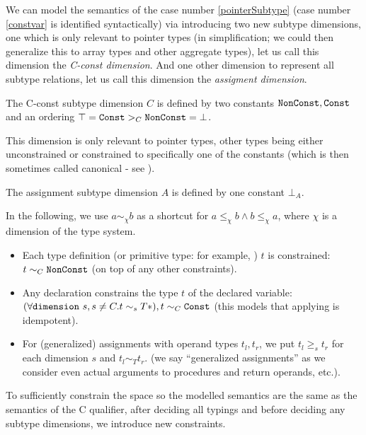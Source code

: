 We can model the semantics of the case number \ref{pointerSubtype} (case number \ref{constvar} is identified syntactically) via introducing two new subtype dimensions, one which is only relevant to pointer types (in simplification; we could then generalize this to array types and other aggregate types), let us call this dimension the \emph{C-const dimension}. And one other dimension to represent all subtype relations, let us call this dimension the \emph{assigment dimension}.

\begin{defn}
    The C-const subtype dimension $C$ is defined by two constants $\mathtt{NonConst}, \mathtt{Const}$ and an ordering $\top = \mathtt{Const} >_C \mathtt{NonConst} = \bot$.

    This dimension is only relevant to pointer types, other types being either unconstrained or constrained to specifically one of the constants (which is then sometimes called canonical - see \cite{tiuryn1999subtyping}).
\end{defn}

\begin{defn}
    The assignment subtype dimension $A$ is defined by one constant $\bot_A$.
\end{defn}

In the following, we use $a \sim_\chi b$ as a shortcut for $a \leq_\chi b \land b \leq_\chi a$, where $\chi$ is a dimension of the type system.

\begin{itemize}
    \item Each type definition (or primitive type: for example, ) $t$ is constrained: $t \sim_C \mathtt{NonConst}$ (on top of any other constraints).

    \item Any declaration  constrains the type $t$ of the declared variable: $(\forall \mathtt{dimension}\ s, s \neq C. t \sim_s T\ast), t \sim_C \mathtt{Const}$ (this models that applying  is idempotent).

    \item For (generalized) assignments with operand types $t_l, t_r$, we put $t_l \geq_s t_r$ for each dimension $s$ and $t_l \sim_T t_r$. (we say ``generalized assignments'' as we consider even actual arguments to procedures and return operands, etc.).
\end{itemize}

To sufficiently constrain the space so the modelled semantics are the same as the semantics of the C  qualifier, after deciding all typings and before deciding any subtype dimensions, we introduce new constraints.

